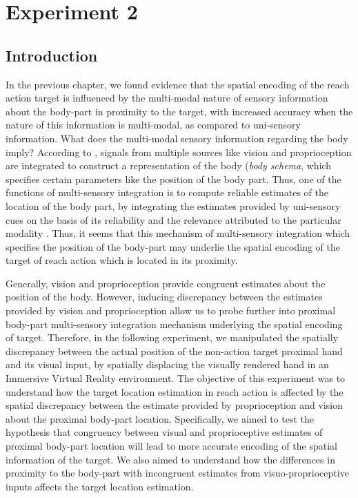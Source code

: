 \chapter{Experiment 2}
\label{exp2.0}

\section{Introduction}

In the previous chapter, we found evidence that the spatial encoding of the reach action target is influenced by the multi-modal nature of sensory information about the body-part in proximity to the target, with increased accuracy when the nature of this information is multi-modal, as compared to uni-sensory information. What does the multi-modal sensory information regarding the body imply? According to \citeauthor{ataria2021body}, signals from multiple sources like vision and proprioception are integrated to construct a representation of the body (\textit{body schema}, which specifies certain parameters like the position of the body part. Thus, one of the functions of multi-sensory integration is to compute reliable estimates of the location of the body part, by integrating the estimates provided by uni-sensory cues on the basis of its reliability and the relevance attributed to the particular modality \citep{limanowski2016integration, noel2018peri, kording2007causal, van1999integration}. Thus, it seems that this mechanism of multi-sensory integration which specifies the position of the body-part may underlie the spatial encoding of the target of reach action which is located in its proximity.

Generally, vision and proprioception provide congruent estimates about the position of the body. However, inducing discrepancy between the estimates provided by vision and proprioception allow us to probe further into proximal body-part multi-sensory integration mechanism underlying the spatial encoding of target. Therefore, in the following experiment, we manipulated the spatially discrepancy between the actual position of the non-action target proximal hand and its visual input, by spatially displacing the visually rendered hand in an Immersive Virtual Reality environment. The objective of this experiment was to understand how the target location estimation in reach action is affected by the spatial discrepancy between the estimate provided by proprioception and vision about the proximal body-part location. Specifically, we aimed to test the hypothesis that congruency between visual and proprioceptive estimates of proximal body-part location will lead to more accurate encoding of the spatial information of the target. We also aimed to understand how the differences in proximity to the body-part with incongruent estimates from visuo-proprioceptive inputs affects the target location estimation. 


